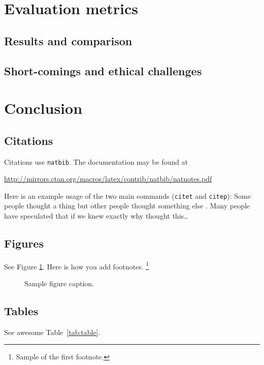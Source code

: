 \documentclass{article}
\begin{document}
\section{Evaluation metrics}

\subsection{Results and comparison}

\subsection{Short-comings and ethical challenges}

\section{Conclusion}

\subsection{Citations}
Citations use \verb+natbib+. The documentation may be found at
\begin{center}
	\url{http://mirrors.ctan.org/macros/latex/contrib/natbib/natnotes.pdf}
\end{center}

Here is an example usage of the two main commands (\verb+citet+ and \verb+citep+): Some people thought a thing \citep{kour2014real, hadash2018estimate} but other people thought something else \citep{kour2014fast}. Many people have speculated that if we knew exactly why \citet{kour2014fast} thought this\dots

\subsection{Figures}
\lipsum[10]
See Figure \ref{fig:fig1}. Here is how you add footnotes. \footnote{Sample of the first footnote.}
\lipsum[11]

\begin{figure}
	\centering
	\fbox{\rule[-.5cm]{4cm}{4cm} \rule[-.5cm]{4cm}{0cm}}
	\caption{Sample figure caption.}
	\label{fig:fig1}
\end{figure}

\subsection{Tables}
See awesome Table~\ref{tab:table}.
\end{document}
